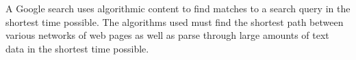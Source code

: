 A Google search uses algorithmic content to find matches to a search
query in the
shortest time possible. The algorithms used must find the shortest path between
various networks of web pages as well as parse through large amounts of text
data in the shortest time possible.
